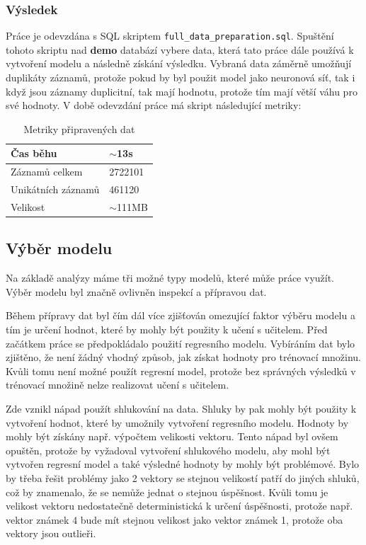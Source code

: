\documentclass[12pt, letterpaper]{article}
\begin{document}
\subsubsection{Výsledek}
Práce je odevzdána s SQL skriptem \texttt{full\_data\_preparation.sql}. Spuštění tohoto skriptu nad \textbf{demo} databází vybere data, která tato 
práce dále používá k vytvoření modelu a následně získání výsledku. Vybraná data záměrně umožňují duplikáty záznamů, 
protože pokud by byl použit model jako neuronová síť, tak i když jsou záznamy duplicitní, tak mají hodnotu, protože
tím mají větší váhu pro své hodnoty. V době odevzdání práce má skript následující metriky:
%
\begin{table}[H]
    \begin{center}
        \begin{tabular}{ | m{} | m{} | }
            \hline
            Čas běhu                     & $\sim$13s \\
            \hline
            Záznamů celkem               & 2722101 \\
            \hline
            Unikátních záznamů           & 461120 \\
            \hline
            Velikost                     & $\sim$111MB \\
            \hline
        \end{tabular}
        \caption{Metriky připravených dat}
        \label{table:data_metrics}
    \end{center}
\end{table}
\subsection{Výběr modelu}
Na základě analýzy máme tři možné typy modelů, které může práce využít. Výběr modelu byl značně ovlivněn inspekcí a 
přípravou dat.

Během přípravy dat byl čím dál více zjišťován omezující faktor výběru modelu a tím je určení hodnot, které by mohly
být použity k učení s učitelem. Před začátkem práce se předpokládalo použití regresního modelu. Vybíráním dat bylo
zjištěno, že není žádný vhodný způsob, jak získat hodnoty pro trénovací množinu. Kvůli tomu není možné použít 
regresní model, protože bez správných výsledků v trénovací množině nelze realizovat učení s učitelem.

Zde vznikl nápad použít shlukování na data. Shluky by pak mohly být použity k vytvoření hodnot, které by umožnily 
vytvoření regresního modelu. Hodnoty by mohly být získány např. výpočtem velikosti vektoru. Tento nápad byl ovšem
opuštěn, protože by vyžadoval vytvoření shlukového modelu, aby mohl být vytvořen regresní model a také výsledné hodnoty
by mohly být problémové. Bylo by třeba řešit problémy jako 2 vektory se stejnou velikostí patří do jiných shluků, což
by znamenalo, že se nemůže jednat o stejnou úspěšnost. Kvůli tomu je velikost vektoru nedostatečně deterministická
k určení úspěšnosti, protože např. vektor známek 4 bude mít stejnou velikost jako vektor známek 1, protože oba vektory 
jsou outlieři.
\end{document}
